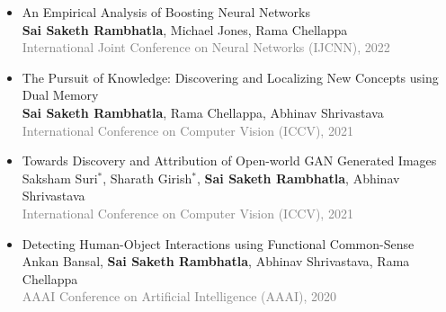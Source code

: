 \documentclass[10pt, letterpaper]{article}
\newcommand{\pub}[3]{\item \begin{minipage}[t]{\linewidth}#1\\#2\\\textcolor{gray}{#3}\end{minipage}} %
\newcommand{\me}{\textbf{Sai Saketh Rambhatla}} %
\let\hrefWithoutArrow\href
\renewcommand{\href}[2]{\hrefWithoutArrow{#1}{\mbox{\ifthenelse{\equal{#2}{}}{ }{#2 }\raisebox{.15ex}{\footnotesize \faExternalLink*}}}}
\begin{document}
\begin{itemize}[itemsep=3pt, parsep=0pt, topsep=2pt]
\pub{An Empirical Analysis of Boosting Neural Networks}
    {\me, Michael Jones, Rama Chellappa}
    {International Joint Conference on Neural Networks (IJCNN), 2022}

\pub{The Pursuit of Knowledge: Discovering and Localizing New Concepts using Dual Memory}
    {\me, Rama Chellappa, Abhinav Shrivastava}
    {International Conference on Computer Vision (ICCV), 2021}

\pub{Towards Discovery and Attribution of Open-world GAN Generated Images}
    {Saksham Suri$^{*}$, Sharath Girish$^{*}$, \me, Abhinav Shrivastava}
    {International Conference on Computer Vision (ICCV), 2021}





\pub{Detecting Human-Object Interactions using Functional Common-Sense}
    {Ankan Bansal, \me, Abhinav Shrivastava, Rama Chellappa}
    {AAAI Conference on Artificial Intelligence (AAAI), 2020}



\end{itemize}
\end{document}
